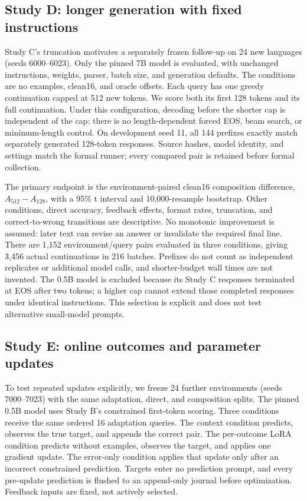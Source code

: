 \documentclass[11pt]{article}
\begin{document}
\subsection{Study D: longer generation with fixed instructions}
Study C's truncation motivates a separately frozen follow-up on 24 new
languages (seeds 6000--6023). Only the pinned 7B model is evaluated, with
unchanged instructions, weights, parser, batch size, and generation defaults.
The conditions are no examples, clean16, and oracle offsets. Each query has
one greedy continuation capped at 512 new tokens. We score both its first
128 tokens and its full continuation. Under this configuration, decoding before
the shorter cap is independent of the cap: there is no length-dependent forced
EOS, beam search, or minimum-length control. On development seed 11, all 144
prefixes exactly match separately generated 128-token responses. Source hashes,
model identity, and settings match the formal runner; every compared pair is
retained before formal collection.

The primary endpoint is the environment-paired clean16 composition difference,
$A_{512}-A_{128}$, with a 95\% t interval and 10,000-resample bootstrap.
Other conditions, direct accuracy, feedback effects, format rates, truncation,
and correct-to-wrong transitions are descriptive. No monotonic improvement is
assumed: later text can revise an answer or invalidate the required final line.
There are 1,152 environment/query pairs evaluated in three conditions, giving
3,456 actual continuations in 216 batches. Prefixes do not count as independent
replicates or additional model calls, and shorter-budget wall times are not
invented. The 0.5B model is excluded because its Study C responses terminated
at EOS after two tokens; a higher cap cannot extend those completed responses
under identical instructions. This selection is explicit and does not test
alternative small-model prompts.

\subsection{Study E: online outcomes and parameter updates}
To test repeated updates explicitly, we freeze 24 further environments
(seeds 7000--7023) with the same adaptation, direct, and composition splits.
The pinned 0.5B model uses Study B's constrained first-token scoring. Three
conditions receive the same ordered 16 adaptation queries. The context
condition predicts, observes the true target, and appends the correct pair.
The per-outcome LoRA condition predicts without examples, observes the target,
and applies one gradient update. The error-only condition applies that update
only after an incorrect constrained prediction. Targets enter no prediction
prompt, and every pre-update prediction is flushed to an append-only journal
before optimization. Feedback inputs are fixed, not actively selected.
\end{document}
